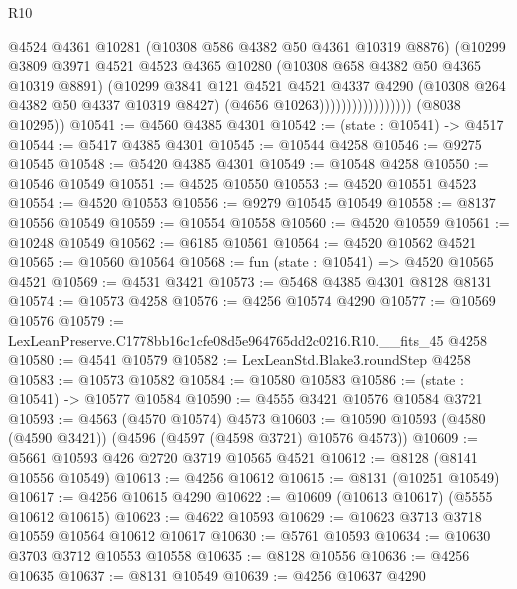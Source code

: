 \begin{lexlean}{R10}
\begin{coremodule}
                                  @4524
                                  @4361
                                  @10281
                                  (@10308 @586 @4382 @50 @4361 @10319 @8876)
                                  (@10299
                                    @3809
                                    @3971
                                    @4521
                                    @4523
                                    @4365
                                    @10280
                                    (@10308 @658 @4382 @50 @4365 @10319 @8891)
                                    (@10299
                                      @3841
                                      @121
                                      @4521
                                      @4521
                                      @4337
                                      @4290
                                      (@10308 @264 @4382 @50 @4337 @10319 @8427)
                                      (@4656 @10263)))))))))))))))))
      (@8038 @10295))
@10541 := @4560 @4385 @4301
@10542 := (state : @10541) -> @4517
@10544 := @5417 @4385 @4301
@10545 := @10544 @4258
@10546 := @9275 @10545
@10548 := @5420 @4385 @4301
@10549 := @10548 @4258
@10550 := @10546 @10549
@10551 := @4525 @10550
@10553 := @4520 @10551 @4523
@10554 := @4520 @10553
@10556 := @9279 @10545 @10549
@10558 := @8137 @10556 @10549
@10559 := @10554 @10558
@10560 := @4520 @10559
@10561 := @10248 @10549
@10562 := @6185 @10561
@10564 := @4520 @10562 @4521
@10565 := @10560 @10564
@10568 := fun (state : @10541) => @4520 @10565 @4521
@10569 := @4531 @3421
@10573 := @5468 @4385 @4301 @8128 @8131
@10574 := @10573 @4258
@10576 := @4256 @10574 @4290
@10577 := @10569 @10576
@10579 := LexLeanPreserve.C1778bb16c1cfe08d5e964765dd2c0216.R10.__fits_45 @4258
@10580 := @4541 @10579
@10582 := LexLeanStd.Blake3.roundStep @4258
@10583 := @10573 @10582
@10584 := @10580 @10583
@10586 := (state : @10541) -> @10577 @10584
@10590 := @4555 @3421 @10576 @10584 @3721
@10593 := @4563 (@4570 @10574) @4573
@10603 := @10590 @10593 (@4580 (@4590 @3421)) (@4596 (@4597 (@4598 @3721) @10576 @4573))
@10609 := @5661 @10593 @426 @2720 @3719 @10565 @4521
@10612 := @8128 (@8141 @10556 @10549)
@10613 := @4256 @10612
@10615 := @8131 (@10251 @10549)
@10617 := @4256 @10615 @4290
@10622 := @10609 (@10613 @10617) (@5555 @10612 @10615)
@10623 := @4622 @10593
@10629 := @10623 @3713 @3718 @10559 @10564 @10612 @10617
@10630 := @5761 @10593
@10634 := @10630 @3703 @3712 @10553 @10558
@10635 := @8128 @10556
@10636 := @4256 @10635
@10637 := @8131 @10549
@10639 := @4256 @10637 @4290

\end{coremodule}
\end{lexlean}
